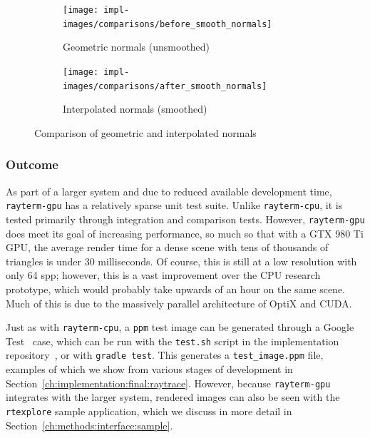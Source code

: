 \vspace{0.3em}
\begin{figure}[htb]
  \centering
  \begin{subfigure}[htb]{0.45\textwidth}
    \texttt{[image: impl-images/comparisons/before\_smooth\_normals]}
    \caption{Geometric normals (unsmoothed)}
\label{fig:rayterm-gpu_unsmoothed_normals}
  \end{subfigure}
  \hspace{1em}
  \begin{subfigure}[htb]{0.45\textwidth}
    \texttt{[image: impl-images/comparisons/after\_smooth\_normals]}
    \caption{Interpolated normals (smoothed)}
\label{fig:rayterm-gpu_smoothed_normals}
  \end{subfigure}
  \caption{Comparison of geometric and interpolated normals}
\label{fig:rayterm-gpu_smooth_normal_comparison}
\end{figure}

\subsubsection{Outcome} \label{ch:methods:renderer:parallel:outcome}

As part of a larger system and due to reduced available development time, \texttt{rayterm-gpu} has a relatively sparse unit test suite.
Unlike \texttt{rayterm-cpu}, it is tested primarily through integration and comparison tests.
However, \texttt{rayterm-gpu} does meet its goal of increasing performance, so much so that with a GTX 980 Ti GPU, the average render time for a dense scene with tens of thousands of triangles is under 30 milliseconds.
Of course, this is still at a low resolution with only 64 spp; however, this is a vast improvement over the CPU research prototype, which would probably take upwards of an hour on the same scene.
Much of this is due to the massively parallel architecture of OptiX and CUDA.

Just as with \texttt{rayterm-cpu}, a \texttt{ppm} test image can be generated through a Google Test~\cite{googletest} case, which can be run with the \texttt{test.sh} script in the implementation repository~\cite{raytermCpuImpl}, or with \texttt{gradle test}.
This generates a \texttt{test\_image.ppm} file, examples of which we show from various stages of development in Section~\ref{ch:implementation:final:raytrace}.
However, because \texttt{rayterm-gpu} integrates with the larger \name{} system, rendered images can also be seen with the \texttt{rtexplore} sample application, which we discuss in more detail in Section~\ref{ch:methods:interface:sample}.

